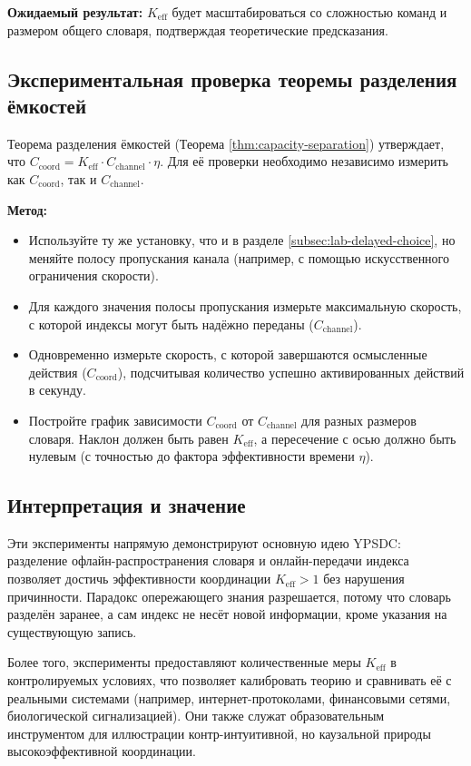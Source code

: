 \documentclass[12pt]{article}
\begin{document}
	\textbf{Ожидаемый результат:} \(K_{\mathrm{eff}}\) будет масштабироваться со сложностью команд и размером общего словаря, подтверждая теоретические предсказания.
	
	\subsection{Экспериментальная проверка теоремы разделения ёмкостей}
	\label{subsec:capacity-theorem}
	
	Теорема разделения ёмкостей (Теорема \ref{thm:capacity-separation}) утверждает, что \(C_{\text{coord}} = K_{\mathrm{eff}} \cdot C_{\text{channel}} \cdot \eta\). Для её проверки необходимо независимо измерить как \(C_{\text{coord}}\), так и \(C_{\text{channel}}\).
	
	\textbf{Метод:}
	\begin{itemize}
		\item Используйте ту же установку, что и в разделе \ref{subsec:lab-delayed-choice}, но меняйте полосу пропускания канала (например, с помощью искусственного ограничения скорости).
		\item Для каждого значения полосы пропускания измерьте максимальную скорость, с которой индексы могут быть надёжно переданы (\(C_{\text{channel}}\)).
		\item Одновременно измерьте скорость, с которой завершаются осмысленные действия (\(C_{\text{coord}}\)), подсчитывая количество успешно активированных действий в секунду.
		\item Постройте график зависимости \(C_{\text{coord}}\) от \(C_{\text{channel}}\) для разных размеров словаря. Наклон должен быть равен \(K_{\mathrm{eff}}\), а пересечение с осью должно быть нулевым (с точностью до фактора эффективности времени \(\eta\)).
	\end{itemize}
	
	\subsection{Интерпретация и значение}
	
	Эти эксперименты напрямую демонстрируют основную идею YPSDC: разделение офлайн-распространения словаря и онлайн-передачи индекса позволяет достичь эффективности координации \(K_{\mathrm{eff}} > 1\) без нарушения причинности. Парадокс опережающего знания разрешается, потому что словарь разделён заранее, а сам индекс не несёт новой информации, кроме указания на существующую запись.
	
	Более того, эксперименты предоставляют количественные меры \(K_{\mathrm{eff}}\) в контролируемых условиях, что позволяет калибровать теорию и сравнивать её с реальными системами (например, интернет-протоколами, финансовыми сетями, биологической сигнализацией). Они также служат образовательным инструментом для иллюстрации контр-интуитивной, но каузальной природы высокоэффективной координации.
	
\end{document}
